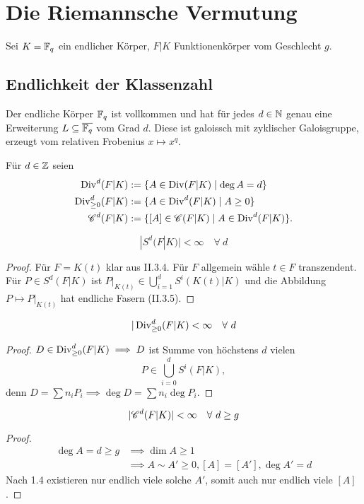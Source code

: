 \chapter{Die Riemannsche Vermutung}
Sei $K =\mathbb{F}_q$ ein endlicher Körper, $F|K$ Funktionenkörper vom Geschlecht $g$.

\section{Endlichkeit der Klassenzahl}
\begin{erinnerungnr}
    Der endliche Körper $\mathbb{F}_q$ ist vollkommen und hat für jedes $d \in \mathbb{N}$ genau eine Erweiterung $L \subseteq \overline{\mathbb{F}_q}$ vom Grad $d$.
    Diese ist galoissch mit zyklischer Galoisgruppe, erzeugt vom relativen Frobenius $x \mapsto x^q$.
\end{erinnerungnr}

\begin{definition}
    Für $d \in \mathbb{Z}$ seien
    \begin{align*}
        \operatorname{Div}^d(F|K) &:= \{A \in \operatorname{Div}(F|K) \mid \deg A = d\} \\
        \operatorname{Div}^d_{\geq 0}(F|K) & := \{A \in \operatorname{Div}^d(F|K) \mid A \geq 0\}\\
        \mathscr{C}^d(F|K) & := \{[A] \in \mathscr{C}(F|K) \mid A \in \operatorname{Div}^d(F|K)\}.
    \end{align*}
\end{definition}

\begin{lemma}
    $$ |S^d(F|K)| < \infty \quad\forall~d$$
\end{lemma}
\begin{proof}
    Für $F = K(t)$ klar aus II.3.4. Für $F$ allgemein wähle $t \in F$ transzendent.
    Für $P \in S^d(F|K)$ ist $P|_{K(t)} \in \bigcup\limits_{i=1}^d S^i(K(t)|K)$ 
    und die Abbildung $P \mapsto P|_{K(t)}$ hat endliche Fasern (II.3.5).
\end{proof}

\begin{satz}
    $$ |\operatorname{Div}^d_{\geq 0} (F|K) < \infty \quad \forall~d$$
\end{satz}
\begin{proof}
    $D \in \operatorname{Div}^d_{\geq 0}(F|K) \implies D$ ist Summe von höchstens $d$ vielen
    $$ P \in \bigcup_{i=0}^d S^i(F|K), $$
    denn $D = \sum n_iP_i \implies \deg D = \sum n_i \deg P_i$. 
\end{proof}

\begin{lemma}
    $$|\mathscr{C}^d(F|K)| < \infty \quad \forall~d \geq g$$
\end{lemma}
\begin{proof}
    \begin{align*}
        \deg A = d \geq g  & \implies \dim A \geq 1\\
        & \implies A \sim A' \geq 0, [A] = [A'], \deg A' = d
    \end{align*}
    Nach 1.4 existieren nur endlich viele solche $A'$, somit auch nur endlich viele $[A]$.
\end{proof}

